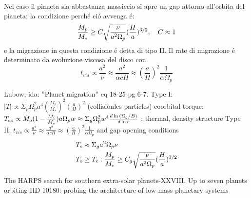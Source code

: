 Nel caso il pianeta sia abbastanza massiccio si apre un gap attorno all'orbita del pianeta; la condizione perch\'e ci\'o avvenga \'e:
\begin{equation}
\frac{M_p}{M_*}\geq C\sqrt{\frac{\nu}{a^2\Omega_p}}(\frac{H}{a})\expy{3/2},\quad C\approx1
\end{equation}
e la migrazione in questa condizione \'e detta di tipo II. Il rate di migrazione \'e determinato da evoluzione viscosa del disco con
\begin{equation}
t_{vis}\propto\frac{a^2}{\nu}\approx\frac{a^2}{\alpha cH}\approx(\frac{a}{H})^2\frac{1}{\alpha\Omega_p}
\end{equation}

\begin{workout}
\cite{lubow2010planet}
Lubow, ida: ''Planet migration'' eq 18-25 pg 6-7.
Type I: $|T|\propto\Sigma_p\Omega_p^2a^4(\frac{M_p}{M_*})^2(\frac{a}{H})^2$ (collisionles particles)
coorbital torque: $T_{co}\propto\dot{M}_o(1-\frac{\dot{M}_i}{\dot{M}_o})a\Omega_pw\approx\Sigma_g\Omega_p^2w^4\TDly{r}{(\Sigma_g/B)}$
\cite{dittkrist2014impacts}: thermal, density structure
Type II: $t_{vis}\propto\frac{a^2}{\nu}\approx\frac{a^2}{\alpha cH}\approx(\frac{a}{H})^2\frac{1}{\alpha\Omega_p}$ and gap opening conditions
\begin{align*}
&T_c\approx\Sigma_ga^2\Omega_p\nu\\
	&T_o\geq T_c: \frac{M_p}{M_*}\geq C_g\sqrt{\frac{\nu}{a^2\Omega_p}}(\frac{H}{a})\expy{3/2}
\end{align*}
\end{workout}


\begin{workout}
The HARPS search for southern extra-solar planets-XXVIII. Up to seven planets orbiting HD 10180: probing the architecture of low-mass planetary systems
\end{workout}
